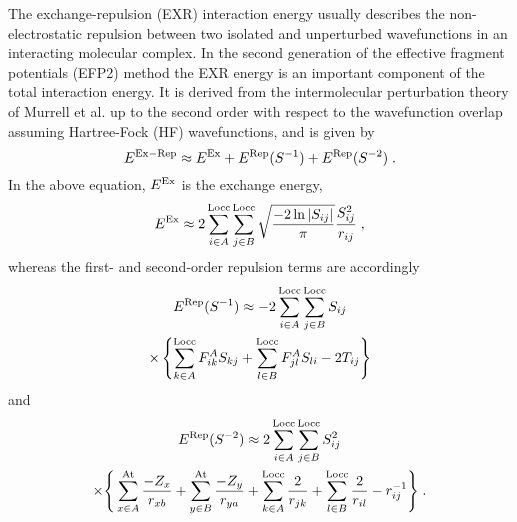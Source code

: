 The exchange\hyp{}repulsion (EXR) interaction energy 
usually describes the non\hyp{}electrostatic repulsion
between two isolated and unperturbed 
wavefunctions in an interacting
molecular 
complex.\cite{Murrell.Randic.Williams.Longuet-Higgins.ProcRSocLondA.1965,Otto.Ladik.ChemPhys.1975,Hayes.Stone.MolPhys.1984,Jeziorski.Moszynski.Szalewicz.ChemRev.1994,Jensen.Gordon.MolPhys.1996,Hesselmann.Jansen.Schutz.JCP.2005,Mandado.Hermida-Ramon.JCTC.2011}
In the
second generation of the
effective fragment potentials (EFP2) method\cite{Gordon.Smith.Xu.Slipchenko.AnnuRevPhysChem.2013,
   Nguyen.Pachter.Day.JCP.2014,
   Day.Jensen.Gordon.Webb.Stevens.Krauss.Garmer.Basch.Cohen.JCP.1996}
the EXR energy is an important component of the total interaction energy.
It is
derived from the intermolecular perturbation theory
of Murrell et al.\cite{Murrell.Randic.Williams.Longuet-Higgins.ProcRSocLondA.1965,Otto.Ladik.ChemPhys.1975} 
up to the second order with respect to the wavefunction overlap
assuming Hartree\hyp{}Fock\cite{Roothaan.RevModPhys.1951} (HF) wavefunctions,
and is given by~\cite{Jensen.JCP.1996,Jensen.Gordon.MolPhys.1996,Jensen.Gordon.JCP.1998}
%
\begin{equation} \label{e:exr-efp2}
 E^{\rm Ex-Rep} \approx
 E^{\rm Ex} +
 E^{\rm Rep}(S^{-1}) + 
 E^{\rm Rep}(S^{-2}) \;.
\end{equation}
%
In the above equation,
$E^{\rm Ex}$ is the exchange energy,\cite{Jensen.JCP.1996}
%
\begin{equation} \label{e:exc-efp2}
 E^{\rm Ex} \approx 2 \sum_{i\in A}^{\rm Locc} \sum_{j\in B}^{\rm Locc} 
 \sqrt{\frac{-2\ln{\vert S_{ij}\vert}}{\pi}} \frac{S^2_{ij}}{r_{ij}} \;,
\end{equation}
%
whereas the first\hyp{} and second\hyp{}order repulsion terms
are accordingly~\cite{Jensen.Gordon.MolPhys.1996,Jensen.Gordon.JCP.1998}
%
\begin{multline} \label{e:rep-efp2.s1}
 E^{\rm Rep}(S^{-1}) \approx - 2 \sum_{i\in A}^{\rm Locc} \sum_{j\in B}^{\rm Locc} S_{ij} \\
 \times
 \left\{
 \sum_{k\in A}^{\rm Locc} F_{ik}^A S_{kj} 
+\sum_{l\in B}^{\rm Locc} F_{jl}^A S_{li} 
 -2T_{ij}
 \right\}
\end{multline}
%
and 
%
\begin{multline} \label{e:rep-efp2.s2}
 E^{\rm Rep}(S^{-2}) \approx 2 \sum_{i\in A}^{\rm Locc} \sum_{j\in B}^{\rm Locc} S_{ij}^2 
 \\ \times 
 \Bigg\{
 \sum_{x\in A}^{\rm At}  \frac{-Z_x}{r_{xb}}
+\sum_{y\in B}^{\rm At}  \frac{-Z_y}{r_{ya}} 
+\sum_{k\in A}^{\rm Locc} \frac{   2}{r_{jk}}
+\sum_{l\in B}^{\rm Locc} \frac{   2}{r_{il}}
-r_{ij}^{-1}
 \Bigg\} \;.
\end{multline}
